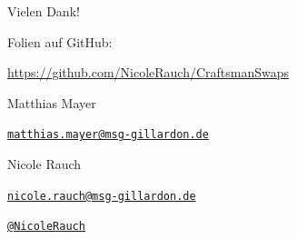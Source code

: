 {
\begin{frame}{Vielen Dank!}

        Folien auf GitHub:
        \vspace{-0.8em}
        \begin{center}
                \url{https://github.com/NicoleRauch/CraftsmanSwaps}
        \end{center}

        \begin{block}{Matthias Mayer}
        \begin{description}[Twitterxx]
                \item[E-Mail]  \href{mailto:matthias.mayer@msg-gillardon.de}{\texttt{matthias.mayer@msg-gillardon.de}}
        \end{description}
        \end{block}
        \begin{block}{Nicole Rauch}
        \begin{description}[Twitterxx]
                \item[E-Mail]  \href{mailto:nicole.rauch@msg-gillardon.de}{\texttt{nicole.rauch@msg-gillardon.de}}
                \item[Twitter] \href{http://twitter.com/NicoleRauch}{\texttt{@NicoleRauch}}
        \end{description}
        \end{block}
\end{frame}
}
